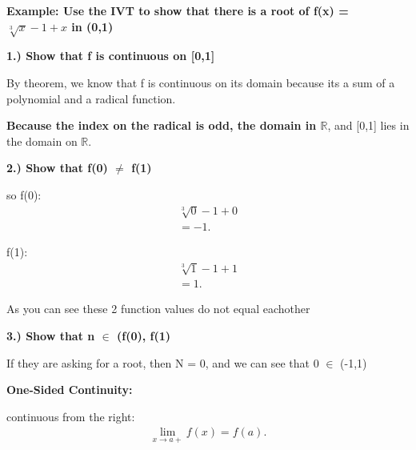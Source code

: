 \documentclass{report}
\begin{document}
        \bigbreak \noindent \bigbreak \noindent 
        \begin{large}
            \noindent \textbf{Example: Use the IVT to show that there is a root of f(x) = $\sqrt[3]{x} -1 + x$ in (0,1)}
        \end{large}

        \bigbreak \noindent \bigbreak \noindent \bigbreak \noindent 
        \textbf{1.) Show that f is continuous on [0,1]}

        \bigbreak \noindent 
        By theorem, we know that f is continuous on its domain because its a sum of a polynomial
        and a radical function.

        \bigbreak \noindent 
        \textbf{Because the index on the radical is odd, the domain in $\mathbb{R}$}, and [0,1] 
        lies in the domain on $\mathbb{R}$.

        \bigbreak \noindent \bigbreak \noindent 
        \textbf{2.) Show that f(0) $\neq$ f(1)} 

        \bigbreak \noindent 
        so f(0):
        \begin{align*}
            \sqrt[3]{0}-1 + 0 \\ 
            = -1
        .\end{align*}

        \bigbreak \noindent 
        f(1):
        \begin{align*}
            \sqrt[3]{1}-1 + 1 \\ 
            = 1
        .\end{align*}

        \bigbreak \noindent 
        As you can see these 2 function values do not equal eachother

        \bigbreak \noindent \bigbreak \noindent 
        \textbf{3.) Show that n $\in$ (f(0), f(1)}

        \bigbreak \noindent 
        If they are asking for a root, then N = 0, and we can see that 0 $\in$ (-1,1)

        \pagebreak
        \begin{Large}
            \noindent \textbf{One-Sided Continuity:}
        \end{Large}

        \bigbreak \noindent \bigbreak \noindent 
        continuous from the right:
        \begin{align*}
            \lim\limits_{x \to a+}{f \left(x\right) = f \left(a\right)}
        .\end{align*}
\end{document}
